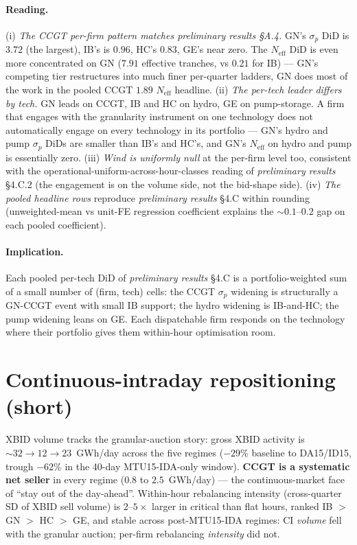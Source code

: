 \documentclass[11pt,a4paper]{article}
\begin{document}
\paragraph{Reading.} (i) \emph{The CCGT per-firm pattern matches
\emph{preliminary results} \S A.4.} GN's $\sigma_p$ DiD is $3.72$
(the largest), IB's is $0.96$, HC's $0.83$, GE's near zero. The
$N_{\text{eff}}$ DiD is even more concentrated on GN ($7.91$
effective tranches, vs $0.21$ for IB) --- GN's competing tier
restructures into much finer per-quarter ladders, GN does most of
the work in the pooled CCGT $1.89$ $N_{\text{eff}}$ headline. (ii)
\emph{The per-tech leader differs by tech.} GN leads on CCGT, IB
and HC on hydro, GE on pump-storage. A firm that engages with the
granularity instrument on one technology does not automatically
engage on every technology in its portfolio --- GN's hydro and pump
$\sigma_p$ DiDs are smaller than IB's and HC's, and GN's
$N_{\text{eff}}$ on hydro and pump is essentially zero. (iii)
\emph{Wind is uniformly null} at the per-firm level too, consistent
with the operational-uniform-across-hour-classes reading of
\emph{preliminary results} \S 4.C.2 (the engagement is on the
volume side, not the bid-shape side). (iv) \emph{The pooled
headline rows} reproduce \emph{preliminary results} \S 4.C within
rounding (unweighted-mean vs unit-FE regression coefficient
explains the $\sim 0.1$--$0.2$ gap on each pooled coefficient).

\paragraph{Implication.} Each pooled per-tech DiD of \emph{preliminary results} \S 4.C is a portfolio-weighted sum of a small number of (firm, tech) cells: the CCGT $\sigma_p$ widening is structurally a GN-CCGT event with small IB support; the hydro widening is IB-and-HC; the pump widening leans on GE. Each dispatchable firm responds on the technology where their portfolio gives them within-hour optimisation room.

\section{Continuous-intraday repositioning (short)}\label{sec:prov:ci_per_tech}

\noindent XBID volume tracks the granular-auction story: gross XBID activity is $\sim\!32 \to 12 \to 23$~GWh/day across the five regimes ($-29\%$ baseline to DA15/ID15, trough $-62\%$ in the 40-day MTU15-IDA-only window). \textbf{CCGT is a systematic net seller} in every regime ($0.8$ to $2.5$~GWh/day) --- the continuous-market face of ``stay out of the day-ahead''. Within-hour rebalancing intensity (cross-quarter SD of XBID sell volume) is $2$--$5\times$ larger in critical than flat hours, ranked IB $>$ GN $>$ HC $>$ GE, and stable across post-MTU15-IDA regimes: CI \emph{volume} fell with the granular auction; per-firm rebalancing \emph{intensity} did not.
\end{document}
